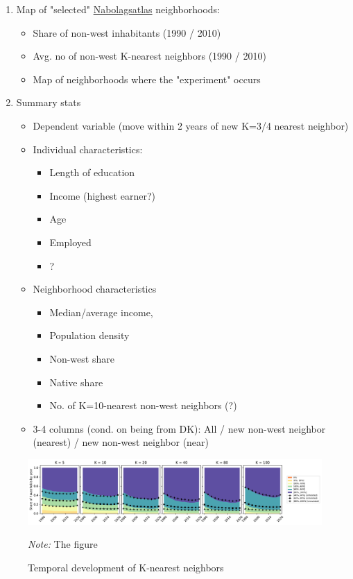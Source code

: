 \documentclass[main.tex]{subfiles}
\begin{document}
\begin{enumerate}
    \item Map of "selected" \href{nabolagstlas.dk}{Nabolagsatlas} neighborhoods:
    \begin{itemize}
        \item Share of non-west inhabitants (1990 / 2010)
        \item Avg. no of non-west K-nearest neighbors (1990 / 2010) 
        \item Map of neighborhoods where the "experiment" occurs
    \end{itemize}
    \item Summary stats
    \begin{itemize}
        \item Dependent variable (move within 2 years of new K=3/4 nearest neighbor)
        \item Individual characteristics:
        \begin{itemize}
            \item Length of education
            \item Income (highest earner?)
            \item Age
            \item Employed
            \item ?
        \end{itemize}
        \item Neighborhood characteristics
        \begin{itemize}
            \item Median/average income,
            \item Population density
            \item Non-west share
            \item Native share
            \item No. of K=10-nearest non-west neighbors (?)
        \end{itemize}
        \item 3-4 columns (cond. on being from DK): All / new non-west neighbor (nearest) / new non-west neighbor (near)
    \end{itemize}
\end{enumerate}

\begin{landscape}
\begin{figure}
      \centering
    \caption{Temporal development of K-nearest neighbors}
    \includegraphics[width=\linewidth]{figs/temporal_knn_native_1990_2020_w_sim.pdf}
    \label{fig:incidence_different_type_dk}
\begin{tablenotes}
\item \footnotesize \textit{Note:} The figure \end{tablenotes}
\end{figure}
\end{landscape}
\end{document}
